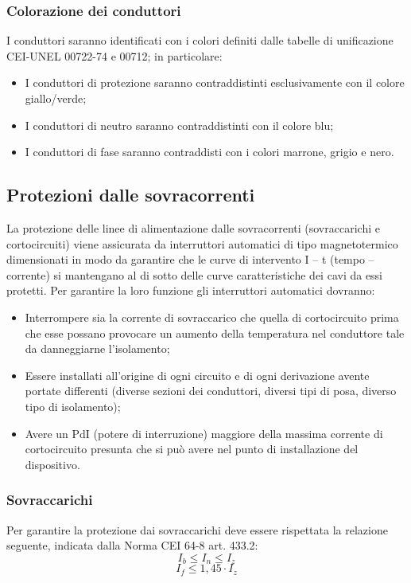 \subsubsection{Colorazione dei conduttori}
I conduttori saranno identificati con i colori definiti dalle tabelle di unificazione CEI-UNEL 00722-74 e 00712; in particolare:
\begin{itemize}
    \item I conduttori di protezione saranno contraddistinti esclusivamente con il colore giallo/verde;
    \item I conduttori di neutro saranno contraddistinti con il colore blu;
    \item I conduttori di fase saranno contraddisti con i colori marrone, grigio e nero.
\end{itemize}



\subsection{Protezioni dalle sovracorrenti}
La protezione delle linee di alimentazione dalle sovracorrenti (sovraccarichi e cortocircuiti) viene assicurata da interruttori automatici di tipo magnetotermico dimensionati in modo da garantire che le curve di intervento I – t (tempo – corrente) si mantengano al di sotto delle curve caratteristiche dei cavi da essi protetti.
Per garantire la loro funzione gli interruttori automatici dovranno:
\begin{itemize}
    \item Interrompere sia la corrente di sovraccarico che quella di cortocircuito prima che esse possano provocare un aumento della temperatura nel conduttore tale da danneggiarne l’isolamento;
    \item Essere installati all’origine di ogni circuito e di ogni derivazione avente portate differenti (diverse sezioni dei conduttori, diversi tipi di posa, diverso tipo di isolamento);
    \item Avere un PdI (potere di interruzione) maggiore della massima corrente di cortocircuito presunta che si può avere nel punto di installazione del dispositivo.
\end{itemize}

\subsubsection{Sovraccarichi}
Per garantire la protezione dai sovraccarichi deve essere rispettata la relazione seguente, indicata dalla Norma CEI 64-8 art. 433.2:
\[ I_b \leq I_n \leq I_z \]
\[ I_f \leq 1{,}45 \cdot I_z \]


